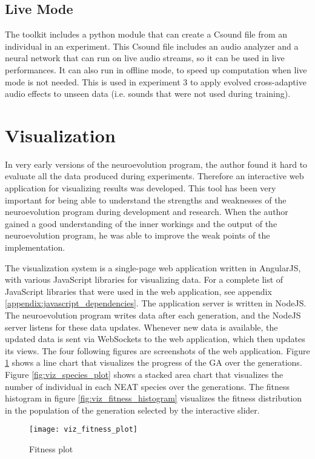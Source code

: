 \subsection{Live Mode}
The toolkit includes a python module that can create a Csound file from an individual in an experiment. This Csound file includes an audio analyzer and a neural network that can run on live audio streams, so it can be used in live performances. It can also run in offline mode, to speed up computation when live mode is not needed. This is used in experiment 3 to apply evolved cross-adaptive audio effects to unseen data (i.e. sounds that were not used during training).

\section{Visualization}
In very early versions of the neuroevolution program, the author found it hard to evaluate all the data produced during experiments. Therefore an interactive web application for visualizing results was developed. This tool has been very important for being able to understand the strengths and weaknesses of the neuroevolution program during development and research. When the author gained a good understanding of the inner workings and the output of the neuroevolution program, he was able to improve the weak points of the implementation.

The visualization system is a single-page web application written in AngularJS, with various JavaScript libraries for visualizing data. For a complete list of JavaScript libraries that were used in the web application, see appendix \ref{appendix:javascript_dependencies}. The application server is written in NodeJS. The neuroevolution program writes data after each generation, and the NodeJS server listens for these data updates. Whenever new data is available, the updated data is sent via WebSockets to the web application, which then updates its views. The four following figures are screenshots of the web application. Figure \ref{fig:viz_fitness_plot} shows a line chart that visualizes the progress of the GA over the generations. Figure \ref{fig:viz_species_plot} shows a stacked area chart that visualizes the number of individual in each NEAT species over the generations. The fitness histogram in figure \ref{fig:viz_fitness_histogram} visualizes the fitness distribution in the population of the generation selected by the interactive slider.

\begin{figure}[H]
    \centering
    \texttt{[image: viz\_fitness\_plot]}
    \caption{Fitness plot}
    \label{fig:viz_fitness_plot}
\end{figure}

